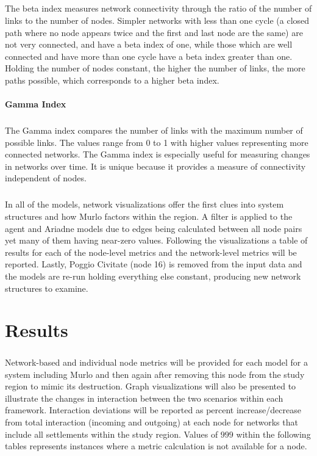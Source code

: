 \documentclass[12pt,a4paper]{thesis}
\begin{document}
\paragraph{}
The beta index measures network connectivity through the ratio of the number of links to the number of nodes. Simpler networks with less than one cycle (a closed path where no node appears twice and the first and last node are the same) are not very connected, and have a beta index of one, while those which are well connected and have more than one cycle have a beta index greater than one. Holding the number of nodes constant, the higher the number of links, the more paths possible, which corresponds to a higher beta index. 

\subsubsection{Gamma Index}
\paragraph{}
The Gamma index compares the number of links with the maximum number of possible links. The values range from 0 to 1 with higher values representing more connected networks. The Gamma index is especially useful for measuring changes in networks over time. It is unique because it provides a measure of connectivity independent of nodes.



\paragraph{}	
In all of the models, network visualizations offer the first clues into system structures and how Murlo factors within the region. A filter is applied to the agent and Ariadne models due to edges being calculated between all node pairs yet many of them having near-zero values. Following the visualizations a table of results for each of the node-level metrics and the network-level metrics will be reported. Lastly, Poggio Civitate (node 16) is removed from the input data and the models are re-run holding everything else constant, producing new network structures to examine. 


\chapter{Results}
\paragraph{}
Network-based and individual node metrics will be provided for each model for a system including Murlo and then again after removing this node from the study region to mimic its destruction. Graph visualizations will also be presented to illustrate the changes in interaction between the two scenarios within each framework. Interaction deviations will be reported as percent increase/decrease from total interaction (incoming and outgoing) at each node for networks that include all settlements within the study region. Values of $999$ within the following tables represents instances where a metric calculation is not available for a node.
\end{document}
